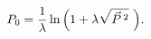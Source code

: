 \begin{equation}
P_0={1\over\lambda}\ln{\left(1+\lambda \sqrt{{\vec P}\,^2}\,\, \right)} .
\end{equation}

